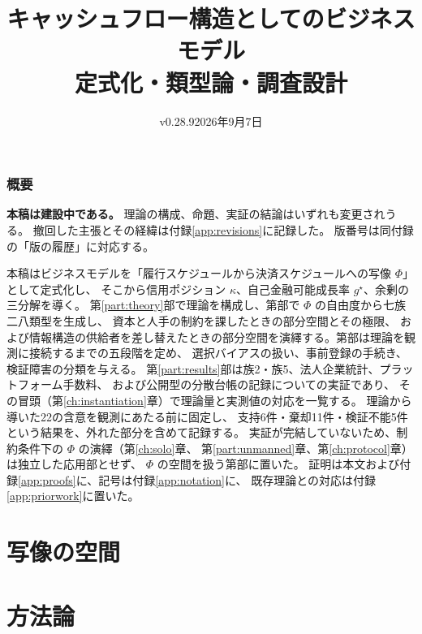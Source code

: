 \documentclass[11pt]{book}
\title{キャッシュフロー構造としてのビジネスモデル\\[6pt]
\large 定式化・類型論・調査設計}
\author{}
\date{v0.28.9\quad 2026年9月7日}
\newenvironment{abstract}{\section*{概要}}{}  %
\theoremstyle{definition}
\begin{document}
\maketitle

\begin{abstract}
\noindent
\textbf{本稿は建設中である。} 理論の構成、命題、実証の結論はいずれも変更されうる。
撤回した主張とその経緯は付録\ref{app:revisions}に記録した。
版番号は同付録の「版の履歴」に対応する。

\medskip
本稿はビジネスモデルを「履行スケジュールから決済スケジュールへの写像 $\Phi$」として定式化し、
そこから信用ポジション $\kappa$、自己金融可能成長率 $g^\star$、余剰の三分解を導く。
第\ref{part:theory}部で理論を構成し、第\ref{part:catalog}部で $\Phi$ の自由度から七族二八類型を生成し、
資本と人手の制約を課したときの部分空間とその極限、
および情報構造の供給者を差し替えたときの部分空間を演繹する。第\ref{part:method}部は理論を観測に接続するまでの五段階を定め、
選択バイアスの扱い、事前登録の手続き、検証障害の分類を与える。
第\ref{part:results}部は族2・族5、法人企業統計、プラットフォーム手数料、
および公開型の分散台帳の記録についての実証であり、
その冒頭（第\ref{ch:instantiation}章）で理論量と実測値の対応を一覧する。
理論から導いた22の含意を観測にあたる前に固定し、
支持6件・棄却11件・検証不能5件という結果を、外れた部分を含めて記録する。
実証が完結していないため、制約条件下の $\Phi$ の演繹（第\ref{ch:solo}章、
第\ref{part:unmanned}章、第\ref{ch:protocol}章）は独立した応用部とせず、
$\Phi$ の空間を扱う第\ref{part:catalog}部に置いた。
証明は本文および付録\ref{app:proofs}に、記号は付録\ref{app:notation}に、
既存理論との対応は付録\ref{app:priorwork}に置いた。
\end{abstract}

\tableofcontents



\part{写像の空間}\label{part:catalog}





\part{方法論}\label{part:method}



\end{document}
